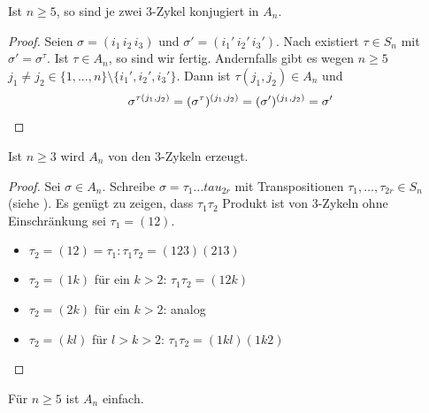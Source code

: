 \begin{lemma}
	Ist $n \geq 5$, so sind je zwei $3$-Zykel konjugiert in $A_n$.
\end{lemma}
\begin{proof}
	Seien $\sigma=(i_1\, i_2\, i_3)$ und $\sigma'=(i_1'\, i_2'\, i_3')$. Nach  existiert $\tau\in S_n$ mit $\sigma'=\sigma^\tau$. Ist $\tau\in A_n$, so sind wir fertig. Andernfalls gibt es wegen $n\ge 5$ $j_1\neq j_2\in\{1,...,n\}\setminus \{i_1',i_2',i_3'\}$. Dann ist $\tau(j_1,j_2)\in A_n$ und
	\begin{align}
		\sigma^{\tau(j_1,j_2)} = (\sigma^\tau)^{(j_1,j_2)} = (\sigma')^{(j_1,j_2)} = \sigma'\notag
	\end{align}
\end{proof}

\begin{lemma}
	Ist $n\geq 3$ wird $A_n$ von den $3$-Zykeln erzeugt.
\end{lemma}

\begin{proof}
	Sei $\sigma \in A_n$. Schreibe $\sigma=\tau_1 \dots tau_{2r}$ mit Transpositionen $\tau_1,\dots,\tau_{2r} \in S_n$ (siehe ). Es genügt zu zeigen, dass $\tau_1\tau_2$ Produkt ist von $3$-Zykeln ohne Einschränkung sei $\tau_1=(12)$.
	\begin{itemize}
		\item $\tau_2 = (12) = \tau_1\colon \tau_1\tau_2 = (123)(213)$
		\item $\tau_2 = (1k)$ für ein $k>2$: $\tau_1\tau_2 = (12k)$
		\item $\tau_2 = (2k)$ für ein $k>2$: analog
		\item $\tau_2 = (kl)$ für $l>k>2$: $\tau_1\tau_2 = (1kl)(1k2)$
	\end{itemize}
\end{proof}

\begin{theorem}
	Für $n\geq 5$ ist $A_n$ einfach.
\end{theorem}

